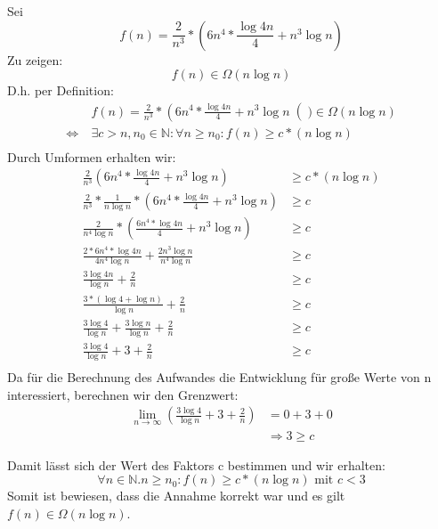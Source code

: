 \documentclass[11pt, oneside]{article}   	%
\begin{document}
Sei 
\begin{equation*}
    f(n) = \frac{2}{n^3} * \left(6n^4*\frac{\log 4n}{4}+n^3\log n\right)
\end{equation*}
 Zu zeigen:
\begin{equation}
  f(n)  \in  \Omega  (n \log n)
\end{equation}
D.h. per Definition:
\begin{align*} 
& f(n) = \frac{2}{n^3} * \left(6n^4*\frac{\log 4n}{4}+n^3\log n\right()    \in   \Omega   (n \log n) \\
\Leftrightarrow \  &   \exists   c > n, n_0  \in   \mathbb{N}:  \forall  n \ge  n_0 : f(n) \ge c * (n \log n) \\
\end{align*}
Durch Umformen erhalten wir:
\begin{align*} 
\frac{2}{n^3}\left(6n^4*\frac{\log 4n}{4}+n^3\log n\right) & \ge c * (n \log n)\\
\frac{2}{n^3} * \frac{1}{n \log n} * \left(6n^4*\frac{\log 4n}{4}+n^3\log n\right) & \ge c\\
\frac{2}{n^4 \log n} * \left(\frac{6n^4 * \log 4n}{4}+n^3\log n\right) & \ge c\\
\frac{2*6n^4 * \log 4n}{4n^4 \log n} + \frac{2n^3\log n }{n^4 \log n} & \ge c\\
\frac{3 \log 4n}{\log n} + \frac{2}{n} & \ge c\\
\frac{3 *(\log 4 + \log n)}{\log n} + \frac{2}{n} & \ge c\\
\frac{3 \log 4}{\log n} + \frac{3 \log n}{\log n} + \frac{2}{n} & \ge c\\
\frac{3 \log 4}{\log n} + 3 + \frac{2}{n}  & \ge c\\
\end{align*}
Da für die Berechnung des Aufwandes die Entwicklung für große Werte von n interessiert, berechnen wir den Grenzwert:
\begin{align*}
\lim_{n\rightarrow\infty}  \left( \frac{3 \log 4}{\log n} + 3 + \frac{2}{n}\right) &  = 0 + 3 +0\\
& \Rightarrow 3 \ge c
\end{align*}

Damit lässt sich der Wert des Faktors c bestimmen und wir erhalten:
\begin{equation*}
\forall n \in \mathbb{N} .   n \ge n_0 : f(n) \ge c * (n \log n)  \mbox{ mit }  c < 3
\end{equation*}
Somit ist bewiesen, dass die Annahme korrekt war und es gilt $ f(n) \in \Omega (n \log n) $.
\end{document}
